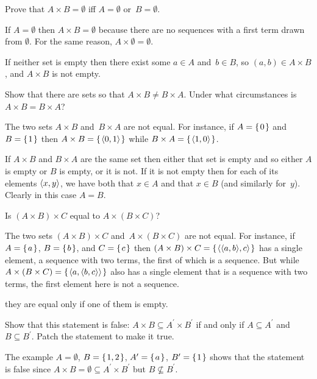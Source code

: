 \documentclass{test}  %
\begin{document}
\begin{problem}
\begin{exes}
\begin{exercise} 
  Prove that $A\times B=\emptyset$ iff $A=\emptyset$ or~$B=\emptyset$.
\end{exercise}
\begin{answer}
  If $A=\emptyset$ then $A\times B=\emptyset$ because there are no 
  sequences with a first term drawn from $\emptyset$.
  For the same reason, $A\times\emptyset=\emptyset$.
 
  If neither set is empty then there exist some $a\in A$ and~$b\in B$, so 
  $(a,b)\in A\times B$, and $A\times B$ is not empty.  
\end{answer}
\begin{exercise} 
  Show that there are sets so that $A\times B\neq B\times A$.
  Under what circumstances is $A\times B=B\times A$?
\end{exercise}
\begin{answer}
  The two sets $A\times B$ and~$B\times A$ are not equal. 
  For instance, if $A=\mbox{$\{\hspace{0.1em}0\hspace{0.1em}\}$}$ and~$B=\mbox{$\{\hspace{0.1em}1\hspace{0.1em}\}$}$ then 
  $A\times B=\mbox{$\{\hspace{0.1em}\langle0,1\rangle\hspace{0.1em}\}$}$
  while
  $B\times A=\mbox{$\{\hspace{0.1em}\langle1,0\rangle\hspace{0.1em}\}$}$.

  If $A\times B$ and $B\times A$ are the same set then either that set is empty 
  and so either $A$ is empty or $B$ is empty,
  or it is not.
  If it is not empty then for each of its elements $\langle x,y\rangle$,
  we have both that $x\in A$ and that $x\in B$ (and similarly for~$y$).
  Clearly in this case $A=B$.  
\end{answer}
\begin{exercise} 
  Is $(A\times B)\times C$ equal to $A\times (B\times C)$?
\end{exercise}
\begin{answer}
  The two sets $(A\times B)\times C$ and~$A\times (B\times C)$ 
  are not equal.
  For instance, if $A=\mbox{$\{\hspace{0.1em}a\hspace{0.1em}\}$}$, $B=\mbox{$\{\hspace{0.1em}b\hspace{0.1em}\}$}$, and $C=\mbox{$\{\hspace{0.1em}c\hspace{0.1em}\}$}$ then 
  $(A\times B)\times C=\mbox{$\{\hspace{0.1em}\langle\langle a,b\rangle,c\rangle\hspace{0.1em}\}$}$
  has a single element, a sequence with two terms, the first
  of which is a sequence.
  But while $A\times(B\times C)=\mbox{$\{\hspace{0.1em}\langle a,\langle b,c\rangle\rangle\hspace{0.1em}\}$}$ 
  also has a single element that is a sequence with two terms, 
  the first element here is not a sequence. 

  \remark they are equal only if one of them is empty.  
\end{answer}
\begin{exercise} 
  Show that this statement is false: 
  $A\times B\subseteq A^\prime\times B^\prime$ if and only if
  $A\subseteq A^\prime$ and $B\subseteq B^\prime$.
  Patch the statement to make it true.
\end{exercise}
\begin{answer}
  The example 
  $A=\emptyset$, $B=\mbox{$\{\hspace{0.1em}1,2\hspace{0.1em}\}$}$, $A^\prime=\mbox{$\{\hspace{0.1em}a\hspace{0.1em}\}$}$, $B^\prime=\mbox{$\{\hspace{0.1em}1\hspace{0.1em}\}$}$
  shows that the statement is false since 
  $A\times B=\emptyset\subseteq A^\prime\times B^\prime$ but 
  $B\not\subseteq B^\prime$.


\end{answer}
\end{exes}
\end{problem}
\end{document}
